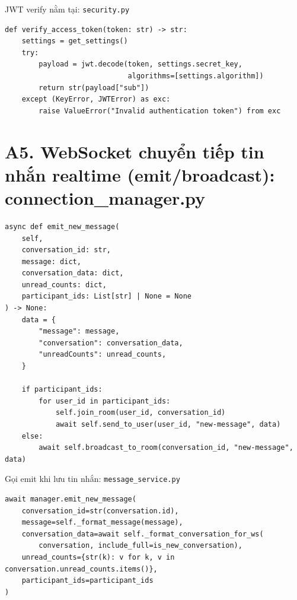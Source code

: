 \noindent JWT verify nằm tại: \texttt{security.py}

\begin{verbatim}
def verify_access_token(token: str) -> str:
    settings = get_settings()
    try:
        payload = jwt.decode(token, settings.secret_key,
                             algorithms=[settings.algorithm])
        return str(payload["sub"])
    except (KeyError, JWTError) as exc:
        raise ValueError("Invalid authentication token") from exc
\end{verbatim}

\section*{A5. WebSocket chuyển tiếp tin nhắn realtime (emit/broadcast): con\-nec\-tion\_ma\-na\-ger.py}

\begin{verbatim}
async def emit_new_message(
    self,
    conversation_id: str,
    message: dict,
    conversation_data: dict,
    unread_counts: dict,
    participant_ids: List[str] | None = None
) -> None:
    data = {
        "message": message,
        "conversation": conversation_data,
        "unreadCounts": unread_counts,
    }

    if participant_ids:
        for user_id in participant_ids:
            self.join_room(user_id, conversation_id)
            await self.send_to_user(user_id, "new-message", data)
    else:
        await self.broadcast_to_room(conversation_id, "new-message", data)
\end{verbatim}

\noindent Gọi emit khi lưu tin nhắn: \texttt{message\_service.py}

\begin{verbatim}
await manager.emit_new_message(
    conversation_id=str(conversation.id),
    message=self._format_message(message),
    conversation_data=await self._format_conversation_for_ws(
        conversation, include_full=is_new_conversation),
    unread_counts={str(k): v for k, v in conversation.unread_counts.items()},
    participant_ids=participant_ids
)
\end{verbatim}
